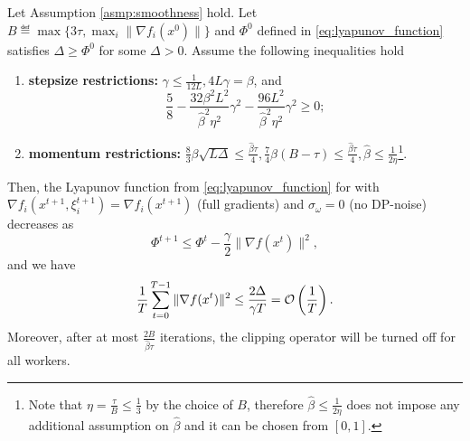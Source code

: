 \documentclass[a4paper,11pt]{article}
\begin{document}
\begin{theorem}
    Let Assumption \ref{asmp:smoothness} hold. Let\\ $B\eqdef \max\{3\tau, \max_i\|\nabla f_i(x^0)\|\}$ and $\Phi^0$ defined in \eqref{eq:lyapunov_function} satisfies $\Delta \ge \Phi^0$ for some $\Delta >0$. Assume the following inequalities hold
    \begin{enumerate}
        \item {\bf stepsize restrictions:} $\gamma \le \frac{1}{12L}, 4L\gamma = \beta$, and 
        \[
        \frac{5}{8}
        - \frac{32\beta^2L^2}{\hat{\beta}^2\eta^2}\gamma^2 
        - \frac{96L^2}{\hat{\beta}^2\eta^2}\gamma^2 \ge 0;
        \]
        \item {\bf momentum restrictions:} $\frac{8}{3}\beta\sqrt{L\Delta} \le \frac{\hat{\beta}\tau}{4}, \frac{7}{4}\beta(B-\tau) \le \frac{\hat{\beta}\tau}{4}, \hat{\beta} \le \frac{1}{2\eta}$\footnote{Note that $\eta = \frac{\tau}{B} \le \frac{1}{3}$ by the choice of $B$, therefore $\hat{\beta} \le \frac{1}{2\eta}$ does not impose any additional assumption on $\hat{\beta}$ and it can be chosen from $[0,1].$}.
    \end{enumerate}
    Then, the Lyapunov function from \eqref{eq:lyapunov_function} for  with $\nabla f_i(x^{t+1},\xi^{t+1}_i) = \nabla f_i(x^{t+1})$ (full gradients) and $\sigma_{\omega} = 0$ (no DP-noise) decreases as
    \[
    \Phi^{t+1} \le \Phi^t - \frac{\gamma}{2}\|\nabla f(x^t)\|^2,
    \]
    and we have
    \begin{equation}
    \frac{1}{T}\sum_{t=0}^{T-1}\|\nabla f(x^t)\|^2  \le \frac{2\Delta}{\gamma T} = \mathcal O\left(\frac{1}{T}\right).
    \end{equation}
    Moreover, after at most $\frac{2B}{\hat{\beta}\tau}$ iterations, the clipping operator will be turned off for all workers.
\end{theorem}
\end{document}

